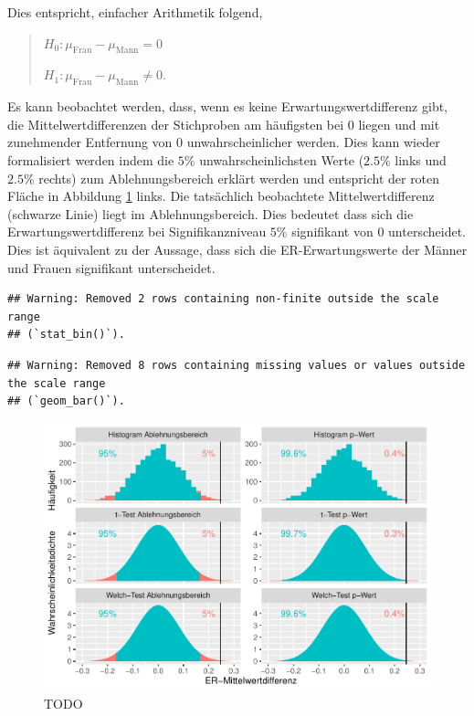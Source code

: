 \documentclass[
]{book}
\theoremstyle{definition}
\theoremstyle{definition}
\theoremstyle{definition}
\theoremstyle{definition}
\theoremstyle{remark}
\begin{document}
Dies entspricht, einfacher Arithmetik folgend,

\begin{quote}
\(H_0: \mu_\text{Frau} - \mu_\text{Mann} = 0\)

\(H_1: \mu_\text{Frau} - \mu_\text{Mann} \neq 0.\)
\end{quote}

Es kann beobachtet werden, dass, wenn es keine Erwartungswertdifferenz gibt, die Mittelwertdifferenzen der Stichproben am häufigsten bei \(0\) liegen und mit zunehmender Entfernung von \(0\) unwahrscheinlicher werden. Dies kann wieder formalisiert werden indem die \(5\%\) unwahrscheinlichsten Werte (\(2.5\%\) links und \(2.5\%\) rechts) zum Ablehnungsbereich erklärt werden und entspricht der roten Fläche in Abbildung \ref{fig:exm-breakup-hist-pval-reja} links. Die tatsächlich beobachtete Mittelwertdifferenz (schwarze Linie) liegt im Ablehnungsbereich. Dies bedeutet dass sich die Erwartungswertdifferenz bei Signifikanzniveau \(5\%\) signifikant von \(0\) unterscheidet. Dies ist äquivalent zu der Aussage, dass sich die ER-Erwartungswerte der Männer und Frauen signifikant unterscheidet.

\begin{verbatim}
## Warning: Removed 2 rows containing non-finite outside the scale range
## (`stat_bin()`).
\end{verbatim}

\begin{verbatim}
## Warning: Removed 8 rows containing missing values or values outside the scale range
## (`geom_bar()`).
\end{verbatim}

\begin{figure}

{\centering \includegraphics{aps_statistik1_files/figure-latex/exm-breakup-hist-pval-reja-1} 

}

\caption{TODO}\label{fig:exm-breakup-hist-pval-reja}
\end{figure}
\end{document}
